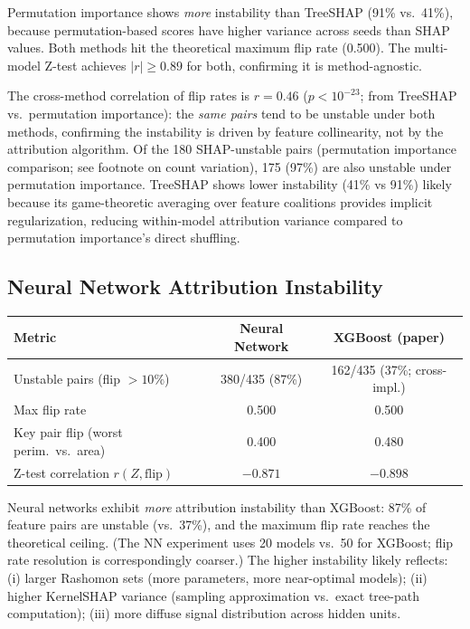 \documentclass{article}
\begin{document}
Permutation importance shows \emph{more} instability than TreeSHAP (91\% vs.\ 41\%), because permutation-based scores have higher variance across seeds than SHAP values. Both methods hit the theoretical maximum flip rate (0.500). The multi-model Z-test achieves $|r| \geq 0.89$ for both, confirming it is method-agnostic.

The cross-method correlation of flip rates is $r = 0.46$ ($p < 10^{-23}$; from TreeSHAP vs.\ permutation importance): the \emph{same pairs} tend to be unstable under both methods, confirming the instability is driven by feature collinearity, not by the attribution algorithm. Of the 180 SHAP-unstable pairs (permutation importance comparison; see footnote on count variation), 175 (97\%) are also unstable under permutation importance. TreeSHAP shows lower instability (41\% vs 91\%) likely because its game-theoretic averaging over feature coalitions provides implicit regularization, reducing within-model attribution variance compared to permutation importance's direct shuffling.

\subsection{Neural Network Attribution Instability}

\begin{center}
\small
\begin{tabular}{@{}lcc@{}}
\toprule
Metric & Neural Network & XGBoost (paper) \\
\midrule
Unstable pairs (flip $> 10\%$) & 380/435 (87\%) & 162/435 (37\%; cross-impl.) \\
Max flip rate & 0.500 & 0.500 \\
Key pair flip (worst perim.\ vs.\ area) & 0.400 & 0.480 \\
Z-test correlation $r(Z, \text{flip})$ & $-0.871$ & $-0.898$ \\
\bottomrule
\end{tabular}
\end{center}

Neural networks exhibit \emph{more} attribution instability than XGBoost: 87\% of feature pairs are unstable (vs.\ 37\%), and the maximum flip rate reaches the theoretical ceiling. (The NN experiment uses 20 models vs.\ 50 for XGBoost; flip rate resolution is correspondingly coarser.) The higher instability likely reflects: (i) larger Rashomon sets (more parameters, more near-optimal models); (ii) higher KernelSHAP variance (sampling approximation vs.\ exact tree-path computation); (iii) more diffuse signal distribution across hidden units.
\end{document}
